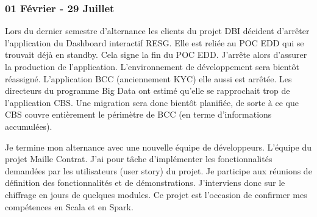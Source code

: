 \subsubsection*{01 Février - 29 Juillet}
\par
Lors du dernier semestre d'alternance les clients du projet DBI décident d'arrêter l'application du Dashboard interactif RESG. Elle est reliée au POC EDD qui se trouvait déjà en standby. Cela signe la fin du POC EDD. J'arrête alors d'assurer la production de l'application. L’environnement de développement sera bientôt réassigné. L’application BCC (anciennement KYC) elle aussi est arrêtée. Les directeurs du programme Big Data ont estimé qu’elle se rapprochait trop de l’application CBS. Une migration sera donc bientôt planifiée, de sorte à ce que CBS couvre entièrement le périmètre de BCC (en terme d’informations accumulées).
\par
Je termine mon alternance avec une nouvelle équipe de développeurs. L’équipe du projet Maille Contrat. J’ai pour tâche d’implémenter les fonctionnalités demandées par les utilisateurs (user story) du projet. Je participe aux réunions de définition des fonctionnalités et de démonstrations. J’interviens donc sur le chiffrage en jours de quelques modules. Ce projet est l’occasion de confirmer mes compétences en Scala et en Spark.
